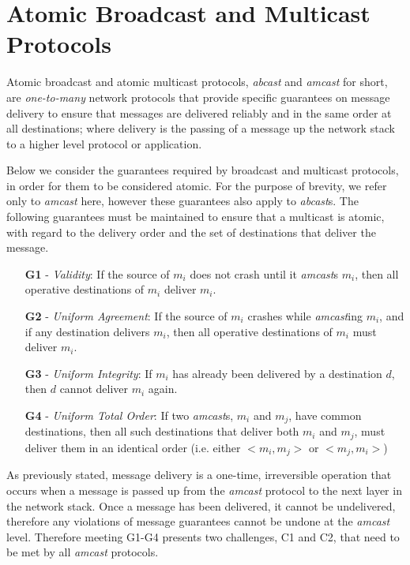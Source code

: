 \section{Atomic Broadcast and Multicast Protocols} \label{sec:atomic_guarantees}
Atomic broadcast and atomic multicast protocols, \emph{abcast} and \emph{amcast} for short, are \emph{one-to-many} network protocols that provide specific guarantees on message delivery to ensure that messages are delivered reliably and in the same order at all destinations; where delivery is the passing of a message up the network stack to a higher level protocol or application.  

Below we consider the guarantees required by broadcast and multicast protocols, in order for them to be considered atomic.  For the purpose of brevity, we refer only to \emph{amcast} here, however these guarantees also apply to \emph{abcast}s.  The following guarantees must be maintained to ensure that a multicast is atomic, with regard to the delivery order and the set of destinations that deliver the message.  

\begin{itemize}
    \item [\textbf{G1}] - \emph{Validity}: If the source of $m_i$ does not crash until it \emph{amcast}s $m_i$, then all operative destinations of $m_i$ deliver $m_i$.
    \item [\textbf{G2}] - \emph{Uniform Agreement}: If the source of $m_i$ crashes while \emph{amcast}ing $m_i$, and if any destination delivers $m_i$, then all operative
destinations of $m_i$ must deliver $m_i$.
    \item [\textbf{G3}] - \emph{Uniform Integrity}: If $m_i$ has already been delivered by a destination $d$, then $d$ cannot deliver $m_i$ again.  
    \item [\textbf{G4}] - \emph{Uniform Total Order}: If two \emph{amcast}s, $m_i$ and $m_j$, have common destinations, then all such destinations that deliver both $m_i$ and $m_j$, must deliver them in an identical order (i.e. either $<m_i, m_j>$ or $<m_j, m_i>$)
\end{itemize}

As previously stated, message delivery is a one-time, irreversible operation that occurs when a message is passed up from the \emph{amcast} protocol to the next layer in the network stack. Once a message has been delivered, it cannot be undelivered, therefore any violations of message guarantees cannot be undone at the \emph{amcast} level.  Therefore meeting G1-G4 presents two challenges, C1 and C2, that need to be met by all \emph{amcast} protocols.

